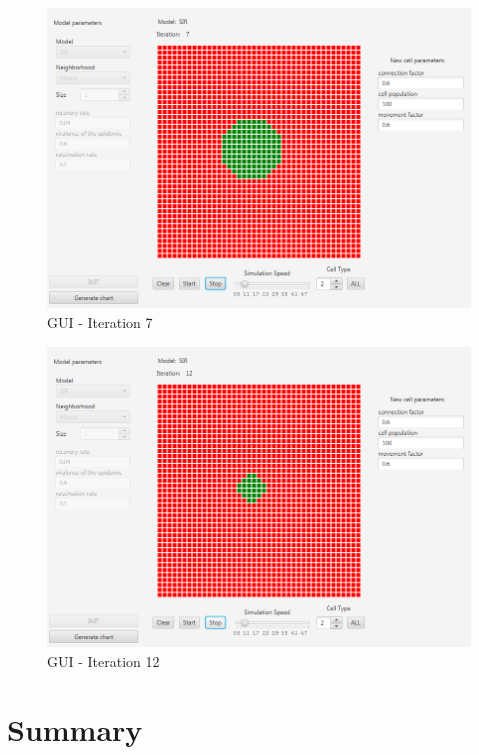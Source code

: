 \documentclass[a4paper, 11pt]{article}
\begin{document}
\begin{figure}[H]
\includegraphics[width=\textwidth]{i7.PNG} 
\caption{GUI - Iteration 7}
\end{figure}
\begin{figure}[H]
\includegraphics[width=\textwidth]{i12.PNG} 
\caption{GUI - Iteration 12}
\end{figure}
\fi
\section{Summary}
\end{document}
